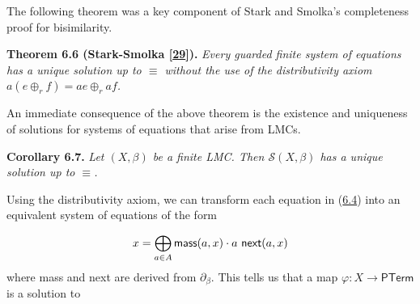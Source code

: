 \documentclass[11pt,a4paper]{amsart}
\begin{document}
\par\medskip
\hypertarget{html:S6.SSx1.p2}{} The following theorem was a key component of Stark and Smolka’s completeness proof for bisimilarity.
\par\medskip
\hypertarget{html:S6.Thmtheorem6}{} \par\noindent\textbf{\textbf{Theorem 6.6}\textbf{ }(Stark-Smolka [\hyperlink{html:bib.bib29}{29}])\textbf{.}}\quad  %
\hypertarget{html:S6.Thmtheorem6.p1}{} \emph{Every guarded finite system of equations has a unique solution up to %
\hypertarget{html:S6.Thmtheorem6.p1.m1}{}\({\equiv}\) without the use of the distributivity axiom %
\hypertarget{html:S6.Thmtheorem6.p1.m2}{}\({a(e\oplus_{r}f)=ae\oplus_{r}af}\).}
\par\medskip
\hypertarget{html:S6.SSx1.p3}{} An immediate consequence of the above theorem is the existence and uniqueness of solutions for systems of equations that arise from LMCs.
\par\medskip
\hypertarget{html:S6.Thmtheorem7}{} \par\noindent\textbf{\textbf{Corollary 6.7}\textbf{.}}\quad  %
\hypertarget{html:S6.Thmtheorem7.p1}{} \emph{Let %
\hypertarget{html:S6.Thmtheorem7.p1.m1}{}\({(X,\beta)}\) be a finite LMC. Then %
\hypertarget{html:S6.Thmtheorem7.p1.m2}{}\({\mathcal{S}(X,\beta)}\) has a unique solution up to %
\hypertarget{html:S6.Thmtheorem7.p1.m3}{}\({\equiv}\).}
\par\medskip
\hypertarget{html:S6.SSx1.p4}{} Using the distributivity axiom, we can transform each equation in (\hyperlink{html:S6.E4}{6.4}) into an equivalent system of equations of the form
\par\medskip
\hypertarget{html:S6.Ex3}{}   %
\hypertarget{html:S6.Ex3.m1}{}\[x=\bigoplus_{a\in A}\mbox{\sf mass}(a,x)\cdot a\leavevmode\nobreak\ \mbox{\sf
next}(a,x)\]    where mass and next are derived from %
\hypertarget{html:S6.SSx1.p4.m3}{}\({\partial_{\beta}}\). This tells us that a map %
\hypertarget{html:S6.SSx1.p4.m4}{}\({\varphi\colon X\to\mathsf{PTerm}}\) is a solution to %
\end{document}
